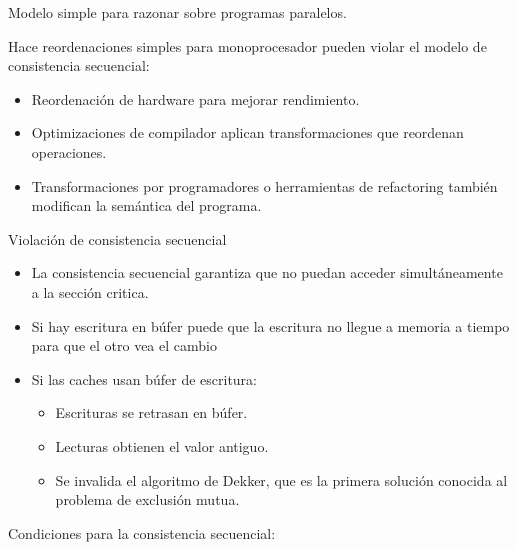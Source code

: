 \documentclass[12pt, twoside, openright]{report} %
\begin{document}
    Modelo simple para razonar sobre programas paralelos.

    Hace reordenaciones simples para monoprocesador pueden violar el
    modelo de consistencia secuencial:

    \begin{itemize}
    
    \item
      Reordenación de hardware para mejorar rendimiento.
    \item
      Optimizaciones de compilador aplican transformaciones que
      reordenan operaciones.
    \item
      Transformaciones por programadores o herramientas de refactoring
      también modifican la semántica del programa.
    \end{itemize}
    \pagebreak

    Violación de consistencia secuencial

    \begin{itemize}
    
    \item
      La consistencia secuencial garantiza que no puedan acceder
      simultáneamente a la sección critica.
    \item
      Si hay escritura en búfer puede que la escritura no llegue a
      memoria a tiempo para que el otro vea el cambio
    \item
      Si las caches usan búfer de escritura:

      \begin{itemize}
      
      \item
        Escrituras se retrasan en búfer.
      \item
        Lecturas obtienen el valor antiguo.
      \item
        Se invalida el algoritmo de Dekker, que es la primera solución
        conocida al problema de exclusión mutua.
      \end{itemize}
    \end{itemize}

    Condiciones para la consistencia secuencial:
\end{document}

